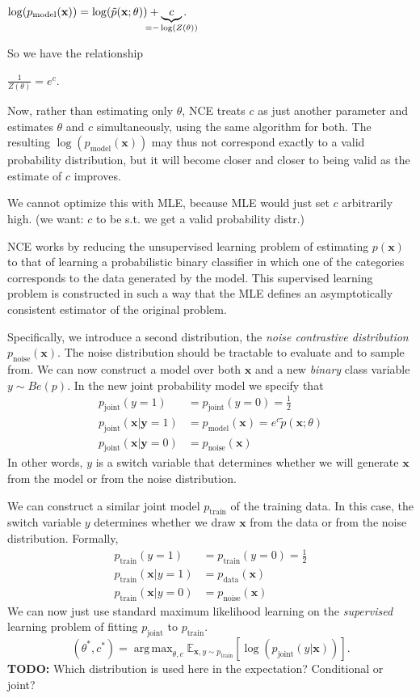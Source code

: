 \documentclass[a2paper,8pt]{extarticle}
\newcommand{\Exp}[2][]{{\mathbb{E}_{#1}}\left[ #2
\right]}
\DeclareMathOperator*{\argmax}{arg\,max}
\renewcommand{\vec}[1]{\mathbf{#1}}
\newcommand{\vx}{\vec{x}}
\newcommand{\vy}{\vec{y}}
\newcommand{\todo}[1]{\textbf{TODO:} #1}
\newcommand{\todo}[1]{%
}
\begin{document}
\begin{landscape}
\begin{multicols*}{7}
$
\log(p_{\text{model}}(\vx))
=
\log(\tilde{p}(\vx;\theta)) +\underbrace{c}_{\mathclap{=-\log(Z(\theta))}}.
$

So we have the relationship

$
\frac{1}{Z(\theta)}=e^{c}.
$

Now, rather than estimating only $\theta$, NCE treats $c$ as just another
parameter and estimates $\theta$ and $c$ simultaneously, using the same
algorithm for both. The resulting $\log(p_{\text{model}}(\vx))$ may thus not
correspond exactly to a valid probability distribution, but it will become
closer and closer to being valid as the estimate of $c$ improves.

We cannot optimize this with MLE, because MLE would just set $c$ arbitrarily
high. (we want: $c$ to be s.t. we get a valid probability distr.)

NCE works by reducing the unsupervised learning problem of estimating $p(\vx)$
to that of learning a probabilistic binary classifier in which one of the
categories corresponds to the data generated by the model. This supervised
learning problem is constructed in such a way that the MLE defines an
asymptotically consistent estimator of the original problem.

Specifically, we introduce a second distribution, the \emph{noise contrastive
distribution} $p_\text{noise}(\vx)$. The noise distribution should be tractable
to evaluate and to sample from. We can now construct a model over both $\vx$ and
a new \emph{binary} class variable $y\sim Be(p)$. In the new joint probability
model we specify that
\begin{align*}
p_{\text{joint}}(y=1)&=p_{\text{joint}}(y=0)=\frac{1}{2}
\\
p_{\text{joint}}(\vx|\vy=1)&=p_{\text{model}}(\vx)=e^c\tilde{p}(\vx;\theta)
\\
p_{\text{joint}}(\vx|\vy=0)&=p_{\text{noise}}(\vx)
\end{align*}
In other words, $y$ is a switch variable that determines whether we will
generate $\vx$ from the model or from the noise distribution.

We can construct a similar joint model $p_{\text{train}}$ of the training data.
In this case, the switch variable $y$ determines whether we draw $\vx$ from the
data or from the noise distribution. Formally,
\begin{align*}
p_{\text{train}}(y=1)&=p_{\text{train}}(y=0)=\frac{1}{2}
\\
p_{\text{train}}(\vx|y=1)&=p_{\text{data}}(\vx)
\\
p_{\text{train}}(\vx|y=0)&=p_{\text{noise}}(\vx)
\end{align*}
We can now just use standard maximum likelihood learning on the
\emph{supervised} learning problem of fitting $p_{\text{joint}}$ to
$p_{\text{train}}$.
\[
(\theta^*,c^*)
=
\argmax_{\theta,c}
\Exp[\vx,y\sim p_{\text{train}}]{\log\left(p_{\text{joint}}(y|\vx)\right)}.
\]
\todo{Which distribution is used here in the expectation? Conditional or joint?}


\end{multicols*}
\end{landscape}
\end{document}
